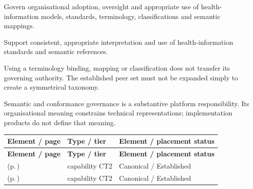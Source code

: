 
Govern organisational adoption, oversight and appropriate use of health-information models, standards, terminology, classifications and semantic mappings.



Support consistent, appropriate interpretation and use of health-information standards and semantic references.



Using a terminology binding, mapping or classification does not transfer its governing authority. The established peer set must not be expanded simply to create a symmetrical taxonomy.



Semantic and conformance governance is a substantive platform responsibility. Its organisational meaning constrains technical representations; implementation products do not define that meaning.


\begingroup\small\setlength{\TableWidth}{\dimexpr\linewidth-6\tabcolsep-4\arrayrulewidth\relax}
\begin{longtable}{|>{\raggedright\arraybackslash}p{0.52\TableWidth}|>{\raggedright\arraybackslash}p{0.2\TableWidth}|>{\raggedright\arraybackslash}p{0.28\TableWidth}|}
\hline\rowcolor{TableHead}\textbf{Element / page} & \textbf{Type / tier} & \textbf{Element / placement status}\\\hline\endfirsthead
\hline\rowcolor{TableHead}\textbf{Element / page} & \textbf{Type / tier} & \textbf{Element / placement status}\\\hline\endhead
\hline\endfoot
\nameref{cap:bc-health-information-standards-governance} (p.\,\pageref{cap:bc-health-information-standards-governance}) & capability CT2 & Canonical / Established\\\hline
\nameref{cap:bc-clinical-semantics-governance} (p.\,\pageref{cap:bc-clinical-semantics-governance}) & capability CT2 & Canonical / Established\\\hline
\end{longtable}\endgroup

